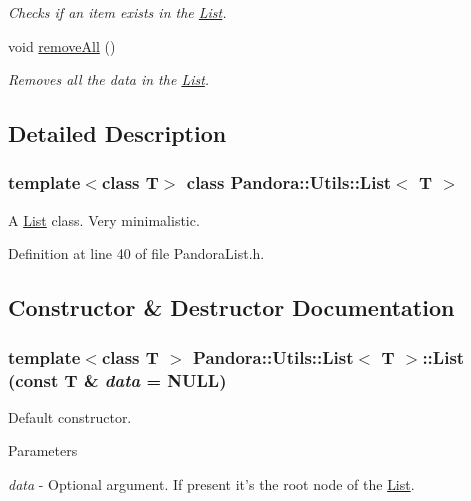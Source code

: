 \begin{DoxyCompactItemize}
\begin{DoxyCompactList}\small\item\em Checks if an item exists in the \hyperlink{classPandora_1_1Utils_1_1List}{List}. \item\end{DoxyCompactList}\item 
void \hyperlink{classPandora_1_1Utils_1_1List_a2dcb0105be0541caf1084c7faa4d1566}{removeAll} ()
\begin{DoxyCompactList}\small\item\em Removes all the data in the \hyperlink{classPandora_1_1Utils_1_1List}{List}. \item\end{DoxyCompactList}\end{DoxyCompactItemize}


\subsection{Detailed Description}
\subsubsection*{template$<$class T$>$ class Pandora::Utils::List$<$ T $>$}

A \hyperlink{classPandora_1_1Utils_1_1List}{List} class. Very minimalistic. 

Definition at line 40 of file PandoraList.h.

\subsection{Constructor \& Destructor Documentation}
\hypertarget{classPandora_1_1Utils_1_1List_aca19ef1d1d19775a487e1fa55a1aeb40}{
\subsubsection[{List}]{\setlength{\rightskip}{0pt plus 5cm}template$<$class T $>$ {\bf Pandora::Utils::List}$<$ T $>$::{\bf List} (const T \& {\em data} = {\ttfamily NULL})}}
\label{classPandora_1_1Utils_1_1List_aca19ef1d1d19775a487e1fa55a1aeb40}


Default constructor. 
\begin{DoxyParams}{Parameters}
\item[{\em data}]-\/ Optional argument. If present it's the root node of the \hyperlink{classPandora_1_1Utils_1_1List}{List}. \end{DoxyParams}


